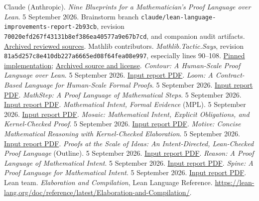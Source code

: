 \documentclass[11pt,letterpaper]{article}
\newcommand{\code}[1]{\nolinkurl{#1}}
\newcommand{\source}[2]{\href{#1}{#2}}
\begin{document}
\clearpage
\begin{thebibliography}{99}
\raggedright
{}
 Claude (Anthropic). \emph{Nine Blueprints for a Mathematician's
Proof Language over Lean}. 5 September 2026. Brainstorm branch
\code{claude/lean-language-improvements-report-2b93cb}, revision
\code{70020efd267f43131b8ef386ea40577a9e67b7cd},
 and companion audit artifacts.
\source{evidence/secondary-review-source.zip}{Archived reviewed sources}.
 Mathlib contributors. \emph{Mathlib.Tactic.Says},
revision \code{81a5d257c8e410db227a6665ed08f64fea08e997}, especially lines 90--108.
\source{https://github.com/leanprover-community/mathlib4/blob/81a5d257c8e410db227a6665ed08f64fea08e997/Mathlib/Tactic/Says.lean}{Pinned implementation};
\source{evidence/mathlib-says-source.zip}{Archived source and license}.
 \emph{Contour: A Human-Scale Proof Language over Lean}.
5 September 2026. \source{../ideas/contour-proof-language/contour.pdf}{Input report PDF}.
 \emph{Loom: A Contract-Based Language for Human-Scale Formal Proofs}.
5 September 2026. \source{../ideas/loom_proof_language/loom.pdf}{Input report PDF}.
 \emph{MathStep: A Proof Language of Mathematical Steps}.
5 September 2026. \source{../ideas/MathStep/MathStep.pdf}{Input report PDF}.
 \emph{Mathematical Intent, Formal Evidence} (MPL).
5 September 2026. \source{../ideas/mathematical_proof_language/article.pdf}{Input report PDF}.
 \emph{Mosaic: Mathematical Intent, Explicit Obligations, and
Kernel-Checked Proof}. 5 September 2026.
\source{../ideas/mosaic_proof_language/mosaic.pdf}{Input report PDF}.
 \emph{Motive: Concise Mathematical Reasoning with Kernel-Checked
Elaboration}. 5 September 2026.
\source{../ideas/motive_proof_language_article/motive.pdf}{Input report PDF}.
 \emph{Proofs at the Scale of Ideas: An Intent-Directed,
Lean-Checked Proof Language} (Outline). 5 September 2026.
\source{../ideas/outline_proof_language/outline_proof_language.pdf}{Input report PDF}.
 \emph{Reason: A Proof Language of Mathematical Intent}.
5 September 2026. \source{../ideas/reason_proof_language/reason.pdf}{Input report PDF}.
 \emph{Spine: A Proof Language for Mathematical Intent}.
5 September 2026.
\source{../ideas/Spine_Proof_Language/Spine_Proof_Language.pdf}{Input report PDF}.
 Lean team. \emph{Elaboration and Compilation}, Lean Language
Reference. \url{https://lean-lang.org/doc/reference/latest/Elaboration-and-Compilation/}.

\end{thebibliography}
\end{document}
